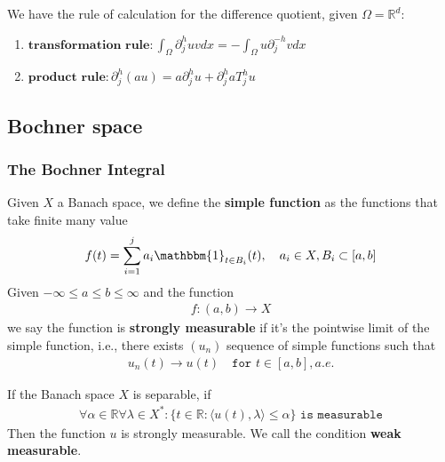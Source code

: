 \begin{proposition}
We have the rule of calculation for the difference quotient, given $\Omega = \mathbb{R}^d$:
	
\end{proposition}

\begin{enumerate}
\item
	$\textbf{transformation rule} :
	  \int_\Omega \partial^h_j u v dx = -\int_\Omega u \partial_j^{-h}vdx$ 
\item $\textbf{product rule} :
	 \partial_j^h(au) = a \partial_j^h u  + \partial_j^h a T_j^h u$
\end{enumerate}	



\subsection{Bochner space}
\subsubsection{The Bochner Integral}
\begin{definition}
	Given $X$ a Banach space, we define the \textbf{simple function} as the functions that take finite many value
	\begin{align*}
		f(t) = \sum_{i = 1}^j a_i \mathbbm{1}_{t \in B_i}(t), \quad a_i \in X, B_i \subset [a, b]
	\end{align*}
	Given $-\infty \le a \le b \le \infty$ and the function
	\begin{align*}
		f: (a, b) \rightarrow X
	\end{align*}
	we say the function is \textbf{strongly measurable} if it's the pointwise limit of the simple function, i.e., there exists $(u_n)$ sequence of simple functions such that
	\begin{align*}
		u_n(t) \rightarrow u(t) \quad \texttt{for } t \in [a, b], a.e.
	\end{align*}
\end{definition}

\begin{theorem}[Pettis]
	If the Banach space $X$ is separable, if
		\begin{align*}
		\forall \alpha \in \mathbb{R} \forall \lambda \in X^* : \{t \in \mathbb{R}: \langle u(t), \lambda \rangle \le \alpha \}  \texttt{ is measurable}
	\end{align*}
	Then the function $u$ is strongly measurable. We call the condition \textbf{weak measurable}.
\end{theorem}


